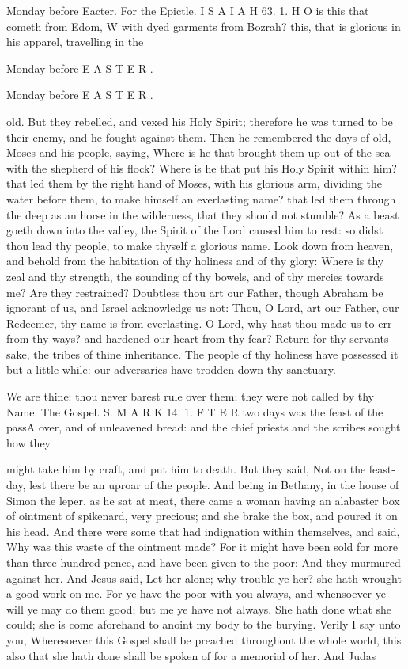 Monday before Eacter. For the Epictle. I S A I A H 63. 1. H O is this that cometh from Edom, W with dyed garments from Bozrah? this, that is glorious in his apparel, travelling in the

Monday before E A S T E R .

Monday before E A S T E R .

old. But they rebelled, and vexed his Holy Spirit; therefore he was turned to be their enemy, and he fought against them. Then he remembered the days of old, Moses and his people, saying, Where is he that brought them up out of the sea with the shepherd of his flock? Where is he that put his Holy Spirit within him? that led them by the right hand of Moses, with his glorious arm, dividing the water before them, to make himself an everlasting name? that led them through the deep as an horse in the wilderness, that they should not stumble? As a beast goeth down into the valley, the Spirit of the Lord caused him to rest: so didst thou lead thy people, to make thyself a glorious name. Look down from heaven, and behold from the habitation of thy holiness and of thy glory: Where is thy zeal and thy strength, the sounding of thy bowels, and of thy mercies towards me? Are they restrained? Doubtless thou art our Father, though Abraham be ignorant of us, and Israel acknowledge us not: Thou, O Lord, art our Father, our Redeemer, thy name is from everlasting. O Lord, why hast thou made us to err from thy ways? and hardened our heart from thy fear? Return for thy servants sake, the tribes of thine inheritance. The people of thy holiness have possessed it but a little while: our adversaries have trodden down thy sanctuary.

We are thine: thou never barest rule over them; they were not called by thy Name. The Gospel. S. M A R K 14. 1. F T E R two days was the feast of the passA over, and of unleavened bread: and the chief priests and the scribes sought how they

might take him by craft, and put him to death. But they said, Not on the feast-day, lest there be an uproar of the people. And being in Bethany, in the house of Simon the leper, as he sat at meat, there came a woman having an alabaster box of ointment of spikenard, very precious; and she brake the box, and poured it on his head. And there were some that had indignation within themselves, and said, Why was this waste of the ointment made? For it might have been sold for more than three hundred pence, and have been given to the poor: And they murmured against her. And Jesus said, Let her alone; why trouble ye her? she hath wrought a good work on me. For ye have the poor with you always, and whensoever ye will ye may do them good; but me ye have not always. She hath done what she could; she is come aforehand to anoint my body to the burying. Verily I say unto you, Wheresoever this Gospel shall be preached throughout the whole world, this also that she hath done shall be spoken of for a memorial of her. And Judas

